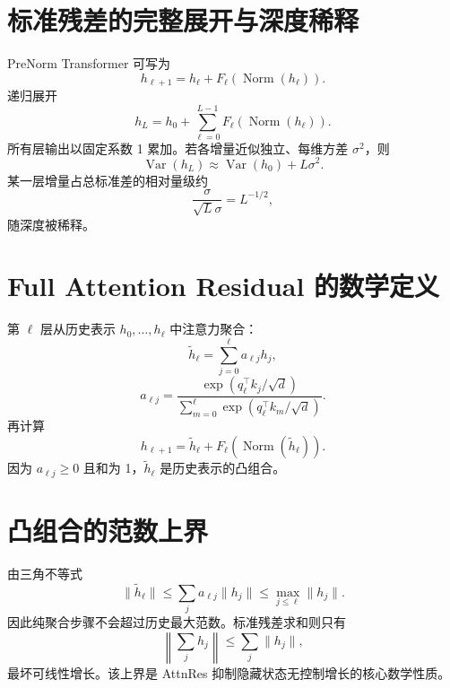 \documentclass[UTF8,12pt,a4paper,fontset=none]{ctexart}
\numberwithin{equation}{section}
\begin{document}
\section{标准残差的完整展开与深度稀释}
PreNorm Transformer 可写为
\begin{equation}
 h_{\ell+1}=h_\ell+F_\ell(\operatorname{Norm}(h_\ell)).
\end{equation}
递归展开
\begin{equation}
 h_L=h_0+\sum_{\ell=0}^{L-1}
 F_\ell(\operatorname{Norm}(h_\ell)).
\end{equation}
所有层输出以固定系数 1 累加。若各增量近似独立、每维方差 $\sigma^2$，则
\begin{equation}
 \operatorname{Var}(h_L)\approx
 \operatorname{Var}(h_0)+L\sigma^2.
\end{equation}
某一层增量占总标准差的相对量级约
\begin{equation}
 \frac{\sigma}{\sqrt{L}\sigma}=L^{-1/2},
\end{equation}
随深度被稀释。

\section{Full Attention Residual 的数学定义}
第 $\ell$ 层从历史表示 $h_0,\ldots,h_\ell$ 中注意力聚合：
\begin{equation}
 \widetilde h_\ell=
 \sum_{j=0}^{\ell}a_{\ell j}h_j,
\end{equation}
\begin{equation}
 a_{\ell j}=\frac{
 \exp(q_\ell^\top k_j/\sqrt d)}
 {\sum_{m=0}^{\ell}
 \exp(q_\ell^\top k_m/\sqrt d)}.
\end{equation}
再计算
\begin{equation}
 h_{\ell+1}=
 \widetilde h_\ell+F_\ell(\operatorname{Norm}(\widetilde h_\ell)).
\end{equation}
因为 $a_{\ell j}\ge0$ 且和为 1，$\widetilde h_\ell$ 是历史表示的凸组合。

\section{凸组合的范数上界}
由三角不等式
\begin{equation}
 \|\widetilde h_\ell\|
 \le\sum_ja_{\ell j}\|h_j\|
 \le\max_{j\le\ell}\|h_j\|.
\end{equation}
因此纯聚合步骤不会超过历史最大范数。标准残差求和则只有
\begin{equation}
 \left\|\sum_jh_j\right\|
 \le\sum_j\|h_j\|,
\end{equation}
最坏可线性增长。该上界是 AttnRes 抑制隐藏状态无控制增长的核心数学性质。
\end{document}
